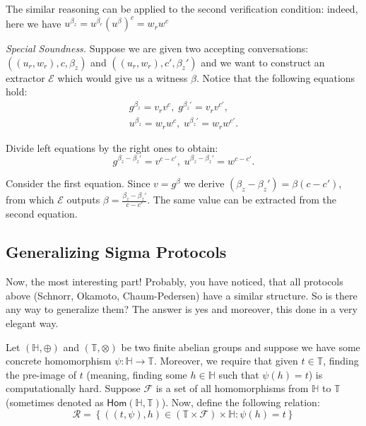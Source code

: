 \documentclass[../lecture-notes-148x210.tex]{subfiles}
\begin{document}
The similar reasoning can be applied to the second verification condition: indeed, here we have $u^{\beta_z} = u^{\beta_r}(u^{\beta})^c = w_rw^c$

\textit{Special Soundness.} Suppose we are given two accepting conversations: $((u_r,w_r),c,\beta_z)$ and $((u_r,w_r),c',\beta_z')$ and we want to construct an extractor $\mathcal{E}$ which would give us a witness $\beta$. Notice that the following equations hold:
\begin{align*}
    g^{\beta_z} = v_rv^c, \; g^{\beta_z'} = v_rv^{c'}, \\ u^{\beta_z} = w_rw^c, \; u^{\beta_z'} = w_rw^{c'}.
\end{align*}

Divide left equations by the right ones to obtain:
\begin{equation*}
    g^{\beta_z - \beta_z'} = v^{c-c'}, \; u^{\beta_z - \beta_z'} = w^{c-c'}.
\end{equation*}

Consider the first equation. Since $v=g^{\beta}$ we derive $(\beta_z-\beta_z') = \beta(c-c')$, from which $\mathcal{E}$ outputs $\beta = \frac{\beta_z-\beta_z'}{c-c'}$. The same value can be extracted from the second equation.

\subsection{Generalizing Sigma Protocols}

Now, the most interesting part! Probably, you have noticed, that all protocols above (Schnorr, Okamoto, Chaum-Pedersen) have a similar structure. So is there any way to generalize them? The answer is yes and moreover, this done in a very elegant way.

Let $(\mathbb{H}, \oplus)$ and $(\mathbb{T}, \otimes)$ be two finite abelian groups and suppose we have some concrete homomorphism $\psi: \mathbb{H} \to \mathbb{T}$. Moreover, we require that given $t \in \mathbb{T}$, finding the pre-image of $t$ (meaning, finding some $h \in \mathbb{H}$ such that $\psi(h)=t$) is computationally hard. Suppose $\mathcal{F}$ is a set of all homomorphisms from $\mathbb{H}$ to $\mathbb{T}$ (sometimes denoted as $\mathsf{Hom}(\mathbb{H}, \mathbb{T})$). Now, define the following relation:
\begin{equation*}
    \mathcal{R} = \left\{ ((t,\psi), h) \in (\mathbb{T} \times \mathcal{F}) \times \mathbb{H}: \psi(h) = t \right\}
\end{equation*}
\end{document}
